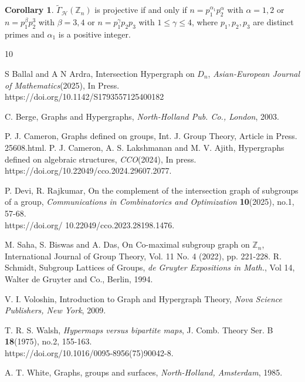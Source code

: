 \documentclass[11pt,a4paper]{article}
\theoremstyle{definition}
\newtheorem{corollary}{Corollary}[theorem]
\theoremstyle{remark}
\begin{document}
		\begin{corollary}
			$\tilde{\Gamma}_\mathcal{H}(\mathbb{Z}_n)$ is projective if and only if $n=p_1^{\alpha_1}p_2^{\alpha}$ with $\alpha=1,2$ or $n=p_1^{\beta}p_2^3$ with  $\beta=3,4$ or $n=p_1^{\gamma}p_2p_3$ with $1 \leq \gamma \leq 4$, where $p_1,p_2,p_3$ are distinct primes and $\alpha_1$ is a positive integer.
		\end{corollary}
		\newpage
		\begin{thebibliography}{10}
	
	
		 S Ballal and A N Ardra, Intersection Hypergraph on $D_n$, \emph{Asian-European Journal of Mathematics}(2025), In Press.\\
	https://doi.org/10.1142/S1793557125400182
	
		 C. Berge, Graphs and Hypergraphs, \emph{North-Holland Pub. Co., London}, 2003.
		
		 P. J. Cameron, Graphs defined on groups, Int. J. Group Theory, Article in Press.
		25608.html.
	  P. J. Cameron, A. S. Lakshmanan and M. V. Ajith, Hypergraphs defined on algebraic structures, \emph{CCO}(2024), In press. \\ 
	https://doi.org/10.22049/cco.2024.29607.2077.
	
	P. Devi, R. Rajkumar, On the complement of the intersection graph of subgroups of
	a group, \emph{Communications in Combinatorics and Optimization} \textbf{10}(2025), no.1, 57-68. \\ https://doi.org/
	10.22049/cco.2023.28198.1476.
	
	 M. Saha, S. Biswas and A. Das, On Co-maximal subgroup graph on $\mathbb{Z}_n$, International Journal of Group Theory, Vol. 11 No. 4 (2022), pp. 221-228. 
	 R. Schmidt,  Subgroup Lattices of Groups, \emph{de Gruyter Expositions in Math.}, Vol 14, Walter de Gruyter and Co., Berlin, 1994.
	 
	 V. I. Voloshin, Introduction to Graph and Hypergraph Theory, \emph{Nova Science Publishers, New York}, 2009.
	
	T. R. S. Walsh, \emph{Hypermaps versus bipartite maps}, J. Comb. Theory Ser. B \textbf{18}(1975), no.2, 155-163. \\ https://doi.org/10.1016/0095-8956(75)90042-8.
	
	 A. T. White, Graphs, groups and surfaces, \emph{North-Holland, Amsterdam}, 1985.
\end{thebibliography}
\end{document}
